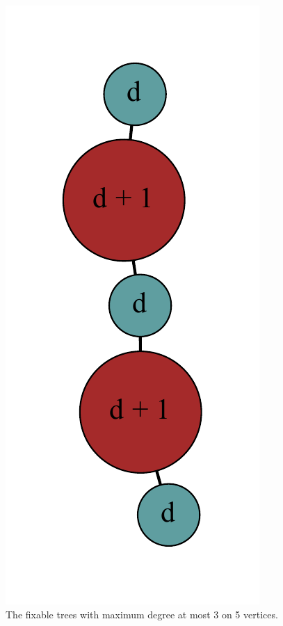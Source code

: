\documentclass[12pt]{article}
\theoremstyle{plain}
\theoremstyle{definition}
\theoremstyle{remark}
\begin{document}
\begin{figure}[htb]
\includegraphics[scale=0.4]{Superabundance/MaxDegree3Trees/0101011000[3,3,1,1,2].pdf}
			\caption{The fixable trees with maximum degree at most 3 on 5 vertices.}
			\label{fig:fixable5tree}
		\end{figure}
		
\end{document}
